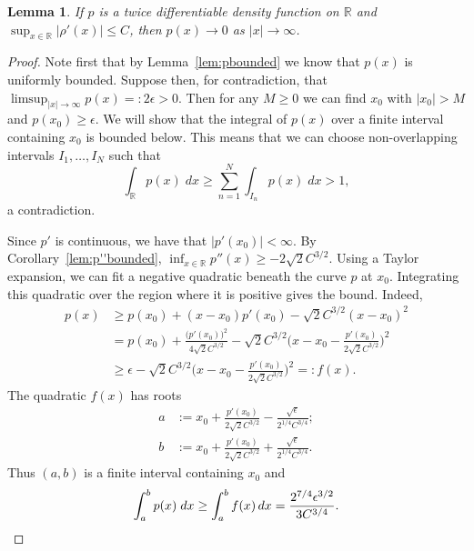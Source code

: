 \documentclass[aos]{imsart}
\newcommand{\R}{\mathbb{R}}
\newtheorem{lemma}[theorem]{Lemma}
\begin{document}
	\begin{lemma}
		\label{lem:pconvergent}
		If $p$ is a twice differentiable density function on $\R$ and $\sup_{x\in\R} |\rho'(x)| \leq C$, then $p(x) \to 0$ as $|x|\to\infty$.
	\end{lemma}
	\begin{proof}
		Note first that by Lemma~\ref{lem:pbounded} we know that $p(x)$ is uniformly bounded.
		Suppose then, for contradiction, that $\limsup_{|x|\to\infty} p(x)=:2\epsilon>0$. Then for any $M\geq 0$ we can find $x_0$ with $|x_0|>M$ and $p(x_0) \geq \epsilon$. We will show that the integral of $p(x)$ over a finite interval containing $x_0$ is bounded below. This means that we can choose non-overlapping intervals $I_1,\ldots, I_N$ such that \begin{equation*}
			\int_{\R}p(x)\;dx \geq \sum_{n=1}^N \int_{I_n} p(x)\;dx >1,
		\end{equation*}
		a contradiction.
		
		
		Since $p'$ is continuous, we have that $|p'(x_0)| < \infty$. By Corollary~\ref{lem:p''bounded}, $\inf_{x\in\R} p''(x) \geq  -2\sqrt{2}C^{3/2}$. Using a Taylor expansion, we can fit a negative quadratic beneath the curve $p$ at $x_0$. Integrating this quadratic over the region where it is positive gives the bound. Indeed,  
		\begin{align*}
			p(x) &\geq p(x_0) + (x-x_0)p'(x_0) - \sqrt{2} C^{3/2}(x-x_0)^2\\
			&= p(x_0) + \frac{\big(p'(x_0)\big)^2}{4\sqrt2 C^{3/2}} - \sqrt{2} C^{3/2}\bigg(x-x_0-\frac{p'(x_0)}{2\sqrt{2} C^{3/2}}\bigg)^2\\
			&\geq \epsilon - \sqrt{2} C^{3/2}\bigg(x-x_0-\frac{p'(x_0)}{2\sqrt{2} C^{3/2}}\bigg)^2 =: f(x).
		\end{align*}
		The quadratic $f(x)$ has roots
		\begin{align*}
			a &:= x_0 + \frac{p'(x_0)}{2\sqrt{2} C^{3/2}} - \frac{\sqrt{\epsilon}}{2^{1/4}C^{3/4}};\\
			b &:= x_0 + \frac{p'(x_0)}{2\sqrt{2} C^{3/2}} + \frac{\sqrt{\epsilon}}{2^{1/4}C^{3/4}}.
		\end{align*}
		Thus $(a,b)$ is a finite interval containing $x_0$ and
		\begin{equation*}
			\int_a^b p(x)\;dx \geq \int_a^b f(x)\,dx = \frac{2^{7/4} \epsilon^{3/2}}{3C^{3/4}}. \qedhere
		\end{equation*}
	\end{proof}
	
\end{document}
